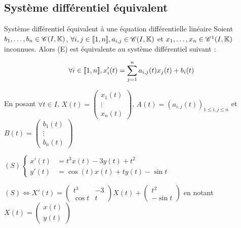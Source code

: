 \subsection{Système différentiel équivalent}

\begin{propositionnt}{Système différentiel équivalent à une équation différentielle linéaire}{}
    Soient $b_1, \dots, b_n \in \mathscr C(I, \mathbb{K})$, 
    $\forall i, j \in [\![1, n]\!], a_{i,j} \in \mathscr C(I, \mathbb{K})$
    et $x_1, \dots, x_n \in \mathscr C^1(I, \mathbb{K})$ inconnues. Alors (E) est équivalente au système différentiel suivant :
    
    $$\forall i \in [\![1, n]\!], x_i'(t) = \sum_{j=1}^n a_{i,j}(t)x_j(t) + b_i(t)$$

    En posant $\forall t \in I$, $X(t) = \begin{pmatrix}
        x_1(t) \\ \vdots \\ x_n(t)
    \end{pmatrix}$, $A(t) = (a_{i, j}(t))_{1 \leq i, j \leq n}$ et $B(t) = \begin{pmatrix}
        b_1(t) \\ \vdots \\ b_n(t)
    \end{pmatrix}$
\end{propositionnt}

\begin{exemple}
    $(S) \begin{cases}
        x'(t) & = t^3 x(t) - 3y(t) + t^2 \\
        y'(t) & = \cos(t) x(t) + t y(t) - \sin t 
    \end{cases}$

    $(S) \Leftrightarrow X'(t) = \begin{pmatrix}
        t^3 & -3 \\
        \cos t & t 
     \end{pmatrix} X(t) + \begin{pmatrix}
        t^2 \\ -\sin t
     \end{pmatrix}$
     en notant $X(t) = \begin{pmatrix}
        x(t) \\ y(t)
    \end{pmatrix}$
\end{exemple}

